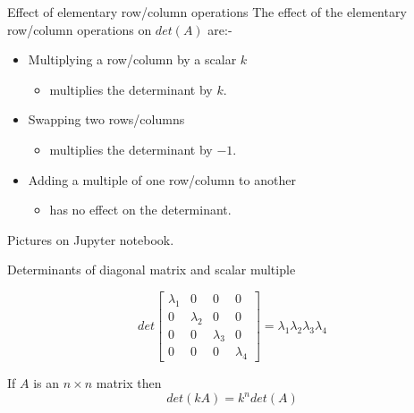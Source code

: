 \documentclass{beamer}
\begin{document}
\begin{frame}{Effect of elementary row/column operations}
  The effect of the elementary row/column operations on $det(A)$ are:-\vfill
  \begin{itemize}
  \item Multiplying a row/column by a scalar $k$
    \begin{itemize}
    \item multiplies the determinant by $k$.
    \end{itemize}\vfill
  \item Swapping two rows/columns
    \begin{itemize}
    \item multiplies the determinant by $-1$.
    \end{itemize}\vfill
  \item Adding a multiple of one row/column to another
    \begin{itemize}
    \item has no effect on the determinant.
    \end{itemize}
  \end{itemize}\vfill
  Pictures on Jupyter notebook.
\end{frame}

\begin{frame}{Determinants of diagonal matrix and scalar multiple}
  \begin{example}
    \begin{equation*}
      det
      \left[
	\begin{array}{cccc}
          \lambda_1 &0&0&0\\
          0&\lambda_2&0&0\\
          0&0&\lambda_3&0\\
          0&0&0&\lambda_4
	\end{array}
      \right] = \lambda_1\lambda_2\lambda_3\lambda_4
    \end{equation*}
  \end{example}\vfill
  \begin{example}
    If $A$ is an $n\times n$ matrix then
    \begin{equation*}
      det(kA) = k^n det(A)
    \end{equation*}
  \end{example}
\end{frame}
\end{document}
